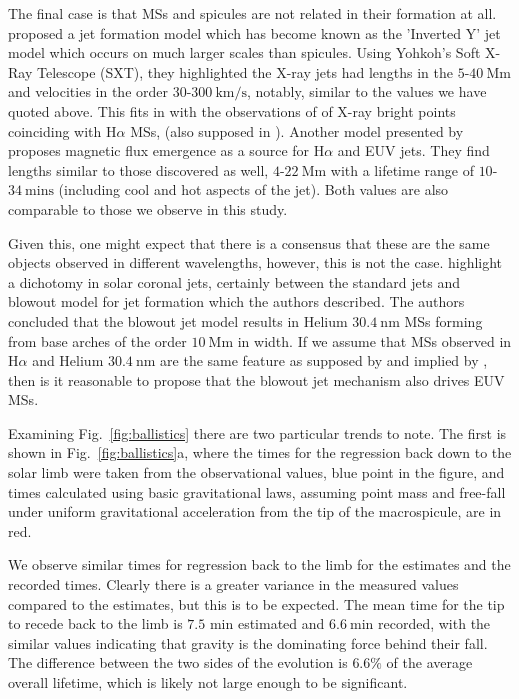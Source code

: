 The final case is that MSs and spicules are not related in their formation at all. \cite{Shibata1992} proposed a jet formation model which has become known as the 'Inverted Y' jet model which occurs on much larger scales than spicules. Using Yohkoh's Soft X-Ray Telescope (SXT), they highlighted the X-ray jets had lengths in the $5$-$40\ \textrm{Mm}$ and velocities in the order $30$-$300\ \textrm{km/s}$, notably, similar to the values we have quoted above. This fits in with the observations of \cite{Moore1977} of X-ray bright points coinciding with H$\alpha$ MSs, (also supposed in \cite{Kamio2010}). Another model presented by \cite{Jiang2007} proposes magnetic flux emergence as a source for H$\alpha$ and EUV jets. They find lengths similar to those discovered as well, $4$-$22\ \textrm{Mm}$ with a lifetime range of $10$-$34\ \textrm{mins}$ (including cool and hot aspects of the jet). Both values are also comparable to those we observe in this study.

Given this, one might expect that there is a consensus that these are the same objects observed in different wavelengths, however, this is not the case. \cite{Moore2010} highlight a dichotomy in solar coronal jets, certainly between the standard jets \cite{Shibata1992} and blowout model for jet formation which the authors described. The authors concluded that the blowout jet model results in Helium $30.4\ \textrm{nm}$ MSs forming from base arches of the order $10\ \textrm{Mm}$ in width. If we assume that MSs observed in H$\alpha$ and Helium $30.4\ \textrm{nm}$ are the same feature as supposed by \cite{LaBonte79} and implied by \cite{Parenti2002}, then is it reasonable to propose that the blowout jet mechanism also drives EUV MSs.

Examining Fig.~\ref{fig:ballistics} there are two particular trends to note. The first is shown in Fig.~\ref{fig:ballistics}a, where the times for the regression back down to the solar limb were taken from the observational values, blue point in the figure, and times calculated using basic gravitational laws, assuming point mass and free-fall under uniform gravitational acceleration from the tip of the macrospicule, are in red. 

We observe similar times for regression back to the limb for the estimates and the recorded times. Clearly there is a greater variance in the measured values compared to the estimates, but this is to be expected. The mean time for the tip to recede back to the limb is $7.5$ min estimated and $6.6\ \textrm{min}$ recorded, with the similar values indicating that gravity is the dominating force behind their fall. The difference between the two sides of the evolution is $6.6\%$ of the average overall lifetime, which is likely not large enough to be significant. 


